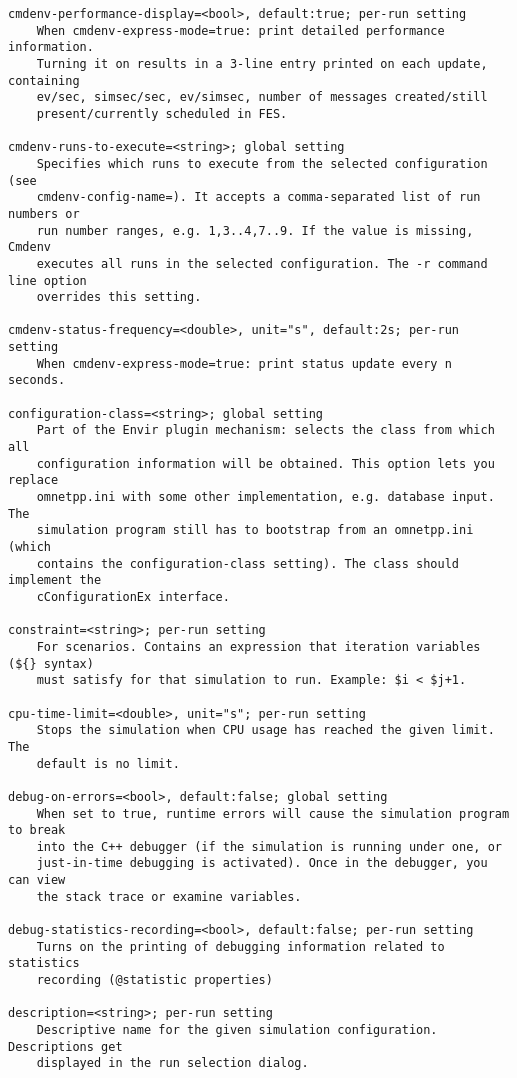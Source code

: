 \begin{verbatim}
cmdenv-performance-display=<bool>, default:true; per-run setting
    When cmdenv-express-mode=true: print detailed performance information.
    Turning it on results in a 3-line entry printed on each update, containing
    ev/sec, simsec/sec, ev/simsec, number of messages created/still
    present/currently scheduled in FES.

cmdenv-runs-to-execute=<string>; global setting
    Specifies which runs to execute from the selected configuration (see
    cmdenv-config-name=). It accepts a comma-separated list of run numbers or
    run number ranges, e.g. 1,3..4,7..9. If the value is missing, Cmdenv
    executes all runs in the selected configuration. The -r command line option
    overrides this setting.

cmdenv-status-frequency=<double>, unit="s", default:2s; per-run setting
    When cmdenv-express-mode=true: print status update every n seconds.

configuration-class=<string>; global setting
    Part of the Envir plugin mechanism: selects the class from which all
    configuration information will be obtained. This option lets you replace
    omnetpp.ini with some other implementation, e.g. database input. The
    simulation program still has to bootstrap from an omnetpp.ini (which
    contains the configuration-class setting). The class should implement the
    cConfigurationEx interface.

constraint=<string>; per-run setting
    For scenarios. Contains an expression that iteration variables (${} syntax)
    must satisfy for that simulation to run. Example: $i < $j+1.

cpu-time-limit=<double>, unit="s"; per-run setting
    Stops the simulation when CPU usage has reached the given limit. The
    default is no limit.

debug-on-errors=<bool>, default:false; global setting
    When set to true, runtime errors will cause the simulation program to break
    into the C++ debugger (if the simulation is running under one, or
    just-in-time debugging is activated). Once in the debugger, you can view
    the stack trace or examine variables.

debug-statistics-recording=<bool>, default:false; per-run setting
    Turns on the printing of debugging information related to statistics
    recording (@statistic properties)

description=<string>; per-run setting
    Descriptive name for the given simulation configuration. Descriptions get
    displayed in the run selection dialog.


\end{verbatim}
